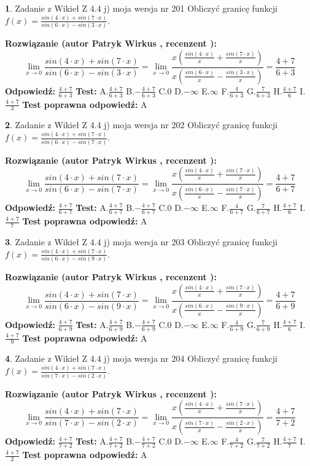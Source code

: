\documentclass[12pt, a4paper]{article}
\theoremstyle{definition} %
\newtheorem{zad}{}
\newcommand{\zadStart}[1]{\begin{zad}#1\newline}
\newcommand{\zadStop}{\end{zad}}
\newcommand{\rozwStart}[2]{\noindent \textbf{Rozwiązanie (autor #1 , recenzent #2): }\newline}
\newcommand{\rozwStop}{\newline}
\newcommand{\odpStart}{\noindent \textbf{Odpowiedź:}\newline}
\newcommand{\odpStop}{\newline}
\newcommand{\testStart}{\noindent \textbf{Test:}\newline}
\newcommand{\testStop}{\newline}
\newcommand{\kluczStart}{\noindent \textbf{Test poprawna odpowiedź:}\newline}
\newcommand{\kluczStop}{\newline}
\begin{document}
\zadStart{Zadanie z Wikieł Z 4.4 j) moja wersja nr 201}
Obliczyć granicę funkcji $f(x)=\frac{sin(4\cdot x) +sin(7\cdot x)}{sin(6\cdot x) -sin(3\cdot x)}$.
\zadStop
\rozwStart{Patryk Wirkus}{}
$$\lim\limits_{x\to 0}\frac{sin(4\cdot x) +sin(7\cdot x)}{sin(6\cdot x) -sin(3\cdot x)}=\lim\limits_{x\to 0}\frac{x(\frac{sin(4\cdot x)}{x}+\frac{sin(7\cdot x)}{x})}{x(\frac{sin(6\cdot x)}{x}-\frac{sin(3\cdot x)}{x})}=\frac{4+7}{6+3}$$
\rozwStop
\odpStart
$\frac{4+7}{6+3}$
\odpStop
\testStart
A.$\frac{4+7}{6+3}$
B.$-\frac{4+7}{6+3}$
C.$0$
D.$-\infty$
E.$\infty$
F.$\frac{4}{6+3}$
G.$\frac{7}{6+3}$
H.$\frac{4+7}{6}$
I.$\frac{4+7}{3}$
\testStop
\kluczStart
A
\kluczStop



\zadStart{Zadanie z Wikieł Z 4.4 j) moja wersja nr 202}
Obliczyć granicę funkcji $f(x)=\frac{sin(4\cdot x) +sin(7\cdot x)}{sin(6\cdot x) -sin(7\cdot x)}$.
\zadStop
\rozwStart{Patryk Wirkus}{}
$$\lim\limits_{x\to 0}\frac{sin(4\cdot x) +sin(7\cdot x)}{sin(6\cdot x) -sin(7\cdot x)}=\lim\limits_{x\to 0}\frac{x(\frac{sin(4\cdot x)}{x}+\frac{sin(7\cdot x)}{x})}{x(\frac{sin(6\cdot x)}{x}-\frac{sin(7\cdot x)}{x})}=\frac{4+7}{6+7}$$
\rozwStop
\odpStart
$\frac{4+7}{6+7}$
\odpStop
\testStart
A.$\frac{4+7}{6+7}$
B.$-\frac{4+7}{6+7}$
C.$0$
D.$-\infty$
E.$\infty$
F.$\frac{4}{6+7}$
G.$\frac{7}{6+7}$
H.$\frac{4+7}{6}$
I.$\frac{4+7}{7}$
\testStop
\kluczStart
A
\kluczStop



\zadStart{Zadanie z Wikieł Z 4.4 j) moja wersja nr 203}
Obliczyć granicę funkcji $f(x)=\frac{sin(4\cdot x) +sin(7\cdot x)}{sin(6\cdot x) -sin(9\cdot x)}$.
\zadStop
\rozwStart{Patryk Wirkus}{}
$$\lim\limits_{x\to 0}\frac{sin(4\cdot x) +sin(7\cdot x)}{sin(6\cdot x) -sin(9\cdot x)}=\lim\limits_{x\to 0}\frac{x(\frac{sin(4\cdot x)}{x}+\frac{sin(7\cdot x)}{x})}{x(\frac{sin(6\cdot x)}{x}-\frac{sin(9\cdot x)}{x})}=\frac{4+7}{6+9}$$
\rozwStop
\odpStart
$\frac{4+7}{6+9}$
\odpStop
\testStart
A.$\frac{4+7}{6+9}$
B.$-\frac{4+7}{6+9}$
C.$0$
D.$-\infty$
E.$\infty$
F.$\frac{4}{6+9}$
G.$\frac{7}{6+9}$
H.$\frac{4+7}{6}$
I.$\frac{4+7}{9}$
\testStop
\kluczStart
A
\kluczStop



\zadStart{Zadanie z Wikieł Z 4.4 j) moja wersja nr 204}
Obliczyć granicę funkcji $f(x)=\frac{sin(4\cdot x) +sin(7\cdot x)}{sin(7\cdot x) -sin(2\cdot x)}$.
\zadStop
\rozwStart{Patryk Wirkus}{}
$$\lim\limits_{x\to 0}\frac{sin(4\cdot x) +sin(7\cdot x)}{sin(7\cdot x) -sin(2\cdot x)}=\lim\limits_{x\to 0}\frac{x(\frac{sin(4\cdot x)}{x}+\frac{sin(7\cdot x)}{x})}{x(\frac{sin(7\cdot x)}{x}-\frac{sin(2\cdot x)}{x})}=\frac{4+7}{7+2}$$
\rozwStop
\odpStart
$\frac{4+7}{7+2}$
\odpStop
\testStart
A.$\frac{4+7}{7+2}$
B.$-\frac{4+7}{7+2}$
C.$0$
D.$-\infty$
E.$\infty$
F.$\frac{4}{7+2}$
G.$\frac{7}{7+2}$
H.$\frac{4+7}{7}$
I.$\frac{4+7}{2}$
\testStop
\kluczStart
A
\kluczStop
\end{document}
